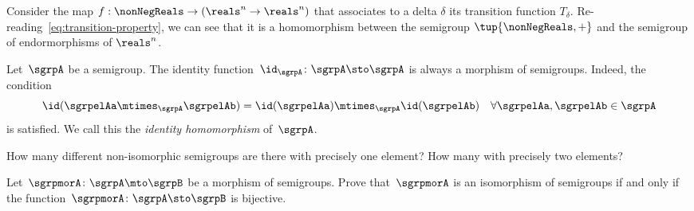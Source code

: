 \begin{example}
\end{example}


\begin{example}
  Consider the map $f: \nonNegReals \to (\reals^n \to \reals^n)$ that associates to a delta $\delta$
  its transition function $T_\delta$.
  Re-reading~\cref{eq:transition-property}, we can see that it is a homomorphism between the semigroup $\tup{\nonNegReals,+}$ and the semigroup of endormorphisms of $\reals^n$.
\end{example}


\begin{definition}
  \label{def:identity-sgrp-mor}
  Let~$\sgrpA$ be a semigroup.
  The identity function~$\id_\sgrpA\colon \sgrpA \sto \sgrpA$ is always a morphism of semigroups.
  Indeed, the condition
  \begin{equation}
    \id (\sgrpelAa \mtimes_{\sgrpA} \sgrpelAb) = \id (\sgrpelAa) \mtimes_{\sgrpA} \id(\sgrpelAb) \quad \forall \sgrpelAa, \sgrpelAb \in \sgrpA
  \end{equation}
  is satisfied. We call this the \emph{identity homomorphism} of~$\sgrpA$.
\end{definition}


\begin{exercise}
  \label{ex:non-isomorphic}
  How many different non-isomorphic semigroups are there with precisely one element?
  How many with precisely two elements?
\end{exercise}
\begin{solution}
\end{solution}

\begin{exercise}
  \label{ex:semi-morph}
  Let~$\sgrpmorA\colon \sgrpA \mto \sgrpB$ be a morphism of semigroups.
  Prove that~$\sgrpmorA$ is an isomorphism of semigroups if and only if the function~$\sgrpmorA\colon \sgrpA \sto \sgrpB$ is bijective.
\end{exercise}
\begin{solution}
\end{solution}


\section{}

